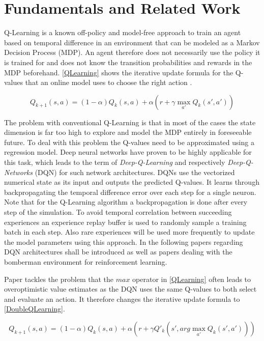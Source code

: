 \section{Fundamentals and Related Work} \label{fundamentals_related_work}

Q-Learning is a known off-policy and model-free approach to train an agent based on temporal difference in an environment that can be modeled as a Markov Decision Process (MDP). An agent therefore does not necessarily use the policy it is trained for and does not know the transition probabilities and rewards in the MDP beforehand. \autoref{QLearning} shows the iterative update formula for the Q-values that an online model uses to choose the right action \cite{Geron2018}.

\begin{equation} \label{QLearning}
	Q_{k+1}(s,a) = (1-\alpha) Q_k(s,a) + \alpha(r + \gamma \max_{a'} Q_k(s',a')) 
\end{equation}

The problem with conventional Q-Learning is that in most of the cases the state dimension is far too high to explore and model the MDP entirely in foreseeable future. To deal with this problem the Q-values need to be approximated using a regression model. Deep neural networks have proven to be highly applicable for this task, which leads to the term of \textit{Deep-Q-Learning} and respectively \textit{Deep-Q-Networks} (DQN) for such network architectures. DQNs use the vectorized numerical state as its input and outputs the predicted Q-values. It learns through backpropagating the temporal difference error over each step for a single neuron. Note that for the Q-Learning algorithm a backpropagation is done after every step of the simulation. To avoid temporal correlation between succeeding experiences an experience replay buffer is used to randomly sample a training batch in each step. Also rare experiences will be used more frequently to update the model parameters using this approach. In the following papers regarding DQN architectures shall be introduced as well as papers dealing with the bomberman environment for reinforcement learning. 

Paper \cite{vanHasselt2015} tackles the problem that the $max$ operator in \ref{QLearning} often leads to overoptimistic value estimates as the DQN uses the same Q-values to both select and evaluate an action. It therefore changes the iterative update formula to \ref{DoubleQLearning}.

\begin{equation} \label{DoubleQLearning}
	Q_{k+1}(s,a) = (1-\alpha) Q_k(s,a) + \alpha(r + \gamma Q'_k(s', arg\max_{a'} Q_k(s',a'))) 
\end{equation}

